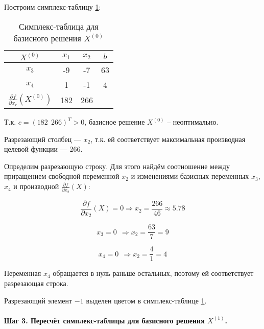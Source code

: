 Построим симплекс-таблицу \ref{tab:simpl:1}:

\begin{table}[H]
\begin{center}
	\caption{Симплекс-таблица для базисного решения $X^{(0)}$}
	\label{tab:simpl:1}
	\def\tabcolsep{18pt}
	\def\arraystretch{1.5}
	\fontsize{13}{14}\selectfont
	\begin{tabular}{|c|c||c||c|}
		\hline 
		$X^{(0)}$ & $x_1$ & $x_2$ & $b$ \\ 
		\hline 
		$x_3$ & -9 & -7 & 63 \\ 
		\hhline{|=|=||=|=|}
		$x_4$ & 1 & \cellcolor{pink} -1 & 4 \\ 
		\hhline{|=|=||=|=|}
		$\frac{\partial f}{\partial x_r} \left(X^{(0)} \right)$ & 182 & 266 &  \\ 
		\hline 
	\end{tabular} 
\end{center}
\end{table}

Т.к. $c = (182\ \ 266)^T > 0$, базисное решение $X^{(0)}$ -- неоптимально.

Разрезающий столбец --- $x_2$, т.к. ей соответствует максимальная производная целевой функции --- 266.

Определим разрезающую строку. Для этого найдём соотношение между приращением свободной переменной $x_2$ и изменениями базисных переменных $x_3$, $x_4$ и производной $\frac{\partial f}{\partial x_2} \left(X \right)$:

\begin{equation*}
	\frac{\partial f}{\partial x_2} \left(X \right) = 0 \Rightarrow x_2 = \frac{266}{46} \approx 5.78
\end{equation*}

\begin{equation*}
	x_3 = 0\ \ \Rightarrow x_2 = \frac{63}{7} = 9
\end{equation*}

\begin{equation*}
	x_4 = 0\ \ \Rightarrow x_2 = \frac{4}{1} = 4
\end{equation*}

Переменная $x_4$ обращается в нуль раньше остальных, поэтому ей соответствует разрезающая строка.

Разрезающий элемент $-1$ выделен цветом в симплекс-таблице \ref{tab:simpl:1}. 

\paragraph{Шаг 3. Пересчёт симплекс-таблицы для базисного решения $X^{(1)}$.}


